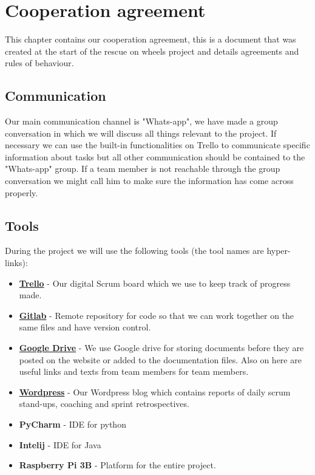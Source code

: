 \documentclass[12pt]{article}
\begin{document}
	\section{Cooperation agreement}
	This chapter contains our cooperation agreement, this is a document that was created at the start of the rescue on wheels project and details agreements and rules of behaviour.
	\subsection{Communication}
	Our main communication channel is "Whats-app", we have made a group conversation in which we will discuss all things relevant to the project. If necessary we can use the built-in functionalities on Trello to communicate specific information about tasks but all other communication should be contained to the "Whats-app" group. If a team member is not reachable through the group conversation we might call him to make sure the information has come across properly.
	\subsection{Tools}
	During the project we will use the following tools (the tool names are hyper-links):
	\begin{itemize}
		\item \href{https://trello.com/b/VLCdhQAQ/sprint-3}{\textbf{Trello}} - Our digital Scrum board which we use to keep track of progress made.
		\item \href{https://gitlab.fdmci.hva.nl/hadiyem/row}{\textbf{Gitlab}} - Remote repository for code so that we can work together on the same files and have version control.
		\item \href{https://drive.google.com/drive/folders/1IJEu7igVdK12MzVx3jkXZMvB5HUXFuYZ?usp=sharing}{\textbf{Google Drive}} - We use Google drive for storing documents before they are posted on the website or added to the documentation files. Also on here are useful links and texts from team members for team members.
		\item \href{https://metabotsrow.wordpress.com/}{\textbf{Wordpress}} - Our Wordpress blog which contains reports of daily scrum stand-ups, coaching and sprint retrospectives.
		\item \textbf{PyCharm} - IDE for python
		\item \textbf{Intelij} - IDE for Java
		\item \textbf{Raspberry Pi 3B} - Platform for the entire project.
	\end{itemize}  
\end{document}
